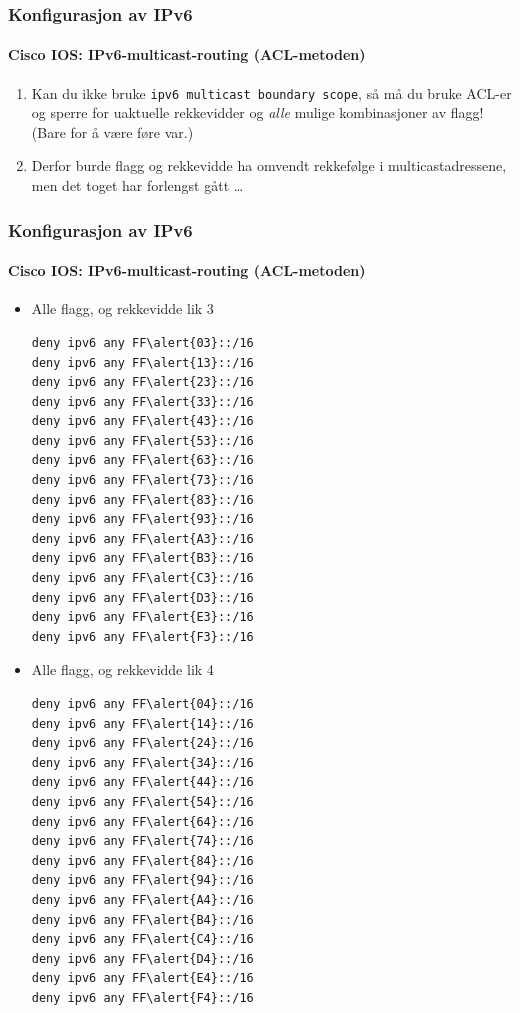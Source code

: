 \begin{frame}%
  \frametitle{Konfigurasjon av IPv6}
  \framesubtitle{Cisco IOS: IPv6-multicast-routing (ACL-metoden)}
  \begin{enumerate}%
  \item Kan du ikke bruke \texttt{ipv6 multicast boundary scope}, så
    må du bruke ACL-er og sperre for uaktuelle rekkevidder og
    \textit{alle\/} mulige kombinasjoner av flagg! (Bare for å være
    føre var.)
  \item Derfor burde flagg og rekkevidde ha omvendt rekkefølge i
    multicastadressene, men det toget har forlengst gått \dots
  \end{enumerate}
\end{frame}

\begin{frame}[fragile]%
  \frametitle{Konfigurasjon av IPv6}
  \framesubtitle{Cisco IOS: IPv6-multicast-routing (ACL-metoden)}
  \begin{multicols}{2}
    \begin{itemize}%
    \item Alle flagg, og rekkevidde lik 3
\begin{Verbatim}[commandchars=\\\{\},fontsize=\scriptsize]
deny ipv6 any FF\alert{03}::/16
deny ipv6 any FF\alert{13}::/16
deny ipv6 any FF\alert{23}::/16
deny ipv6 any FF\alert{33}::/16
deny ipv6 any FF\alert{43}::/16
deny ipv6 any FF\alert{53}::/16
deny ipv6 any FF\alert{63}::/16
deny ipv6 any FF\alert{73}::/16
deny ipv6 any FF\alert{83}::/16
deny ipv6 any FF\alert{93}::/16
deny ipv6 any FF\alert{A3}::/16
deny ipv6 any FF\alert{B3}::/16
deny ipv6 any FF\alert{C3}::/16
deny ipv6 any FF\alert{D3}::/16
deny ipv6 any FF\alert{E3}::/16
deny ipv6 any FF\alert{F3}::/16
\end{Verbatim}
    \item Alle flagg, og rekkevidde lik 4
\begin{Verbatim}[commandchars=\\\{\},fontsize=\scriptsize]
deny ipv6 any FF\alert{04}::/16
deny ipv6 any FF\alert{14}::/16
deny ipv6 any FF\alert{24}::/16
deny ipv6 any FF\alert{34}::/16
deny ipv6 any FF\alert{44}::/16
deny ipv6 any FF\alert{54}::/16
deny ipv6 any FF\alert{64}::/16
deny ipv6 any FF\alert{74}::/16
deny ipv6 any FF\alert{84}::/16
deny ipv6 any FF\alert{94}::/16
deny ipv6 any FF\alert{A4}::/16
deny ipv6 any FF\alert{B4}::/16
deny ipv6 any FF\alert{C4}::/16
deny ipv6 any FF\alert{D4}::/16
deny ipv6 any FF\alert{E4}::/16
deny ipv6 any FF\alert{F4}::/16
\end{Verbatim}
    \end{itemize}
  \end{multicols}
\end{frame}

